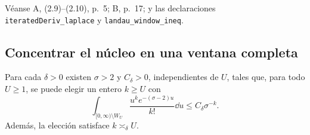 {\raggedright
Véanse A, (2.9)--(2.10), p.~5; B, p.~17; y las declaraciones
\texttt{iteratedDeriv\_laplace} y \texttt{landau\_window\_ineq}.
\par}

\subsection{Concentrar el núcleo en una ventana completa}

\begin{lema}
\label{vent-colas}
Para cada $\delta>0$ existen $\sigma>2$ y $C_\delta>0$, independientes
de $U$, tales que, para todo $U\ge1$, se puede elegir un entero $k\ge U$
con
\begin{equation}
 \int_{[0,\infty)\setminus W_U}
 \frac{u^ke^{-(\sigma-2)u}}{k!}\dd u
 \le C_\delta\sigma^{-k}.
 \label{vent-cota-colas}
\end{equation}
Además, la elección satisface $k\asymp_\delta U$.
\end{lema}

